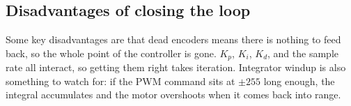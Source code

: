 \documentclass{article}
\begin{document}
\subsection{Disadvantages of closing the loop}

\noindent Some key disadvantages are that dead encoders means there is nothing to feed back, so the whole point of the controller is gone. $K_p$, $K_i$, $K_d$, and the sample rate all interact, so getting them right takes iteration. Integrator windup is also something to watch for: if the PWM command sits at $\pm 255$ long enough, the integral accumulates and the motor overshoots when it comes back into range.
\end{document}

